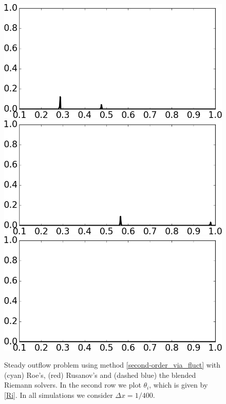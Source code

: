 \documentclass[preprint, 11pt]{article}
\begin{document}
\begin{figure}[!h]
{    \vspace{15pt}
    \includegraphics[scale=0.29]{figures/outflow_1D_Ri_t0p5.png}
    \qquad
    \includegraphics[scale=0.29]{figures/outflow_1D_Ri_t1p3.png}
    \qquad
    \includegraphics[scale=0.29]{figures/outflow_1D_Ri_t10p0.png}
  }
  \caption{
    Steady outflow problem using method \eqref{second-order_via_fluct} with
    (cyan) Roe's, (red) Rusanov's and (dashed blue) the blended Riemann solvers.
    In the second row we plot $\theta_i$, which is given by \eqref{Ri}.
    In all simulations we consider $\Delta x=1/400$.
    \label{fig:steady_outflow}}
\end{figure}
\end{document}
